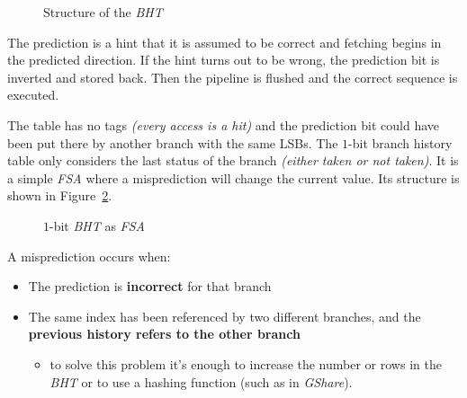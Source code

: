 \documentclass[english]{article}
\begin{document}
\begin{figure}[htbp]
  \bigskip
  \centering
  \caption{Structure of the \textit{BHT}}
  \label{fig:structure-of-BHT}
  \bigskip
\end{figure}

The prediction is a hint that it is assumed to be correct and fetching begins in the predicted direction.
If the hint turns out to be wrong, the prediction bit is inverted and stored back.
Then the pipeline is flushed and the correct sequence is executed.

The table has no tags \textit{(every access is a hit)} and the prediction bit could have been put there by another branch with the same LSBs.
The \(1\)-bit branch history table only considers the last status of the branch \textit{(either taken or not taken)}.
It is a simple \textit{FSA} where a misprediction will change the current value.
Its structure is shown in Figure~\ref{fig:BHT-as-FSA}.

\begin{figure}[htbp]
  \bigskip
  \centering


  \caption{\(1\)-bit \textit{BHT} as \textit{FSA}}
  \label{fig:BHT-as-FSA}
  \bigskip
\end{figure}

A misprediction occurs when:

\begin{itemize}
  \item The prediction is \textbf{incorrect} for that branch
  \item The same index has been referenced by two different branches, and the \textbf{previous history refers to the other branch}
        \begin{itemize}
          \item to solve this problem it's enough to increase the number or rows in the \textit{BHT} or to use a hashing function (such as in \textit{GShare}).
        \end{itemize}
\end{itemize}
\end{document}
